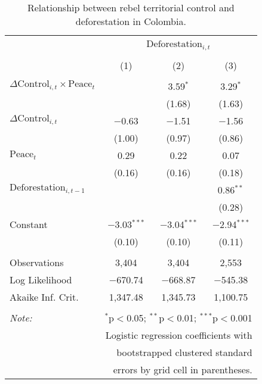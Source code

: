 
\begin{table}[!htbp] \centering 
  \caption{Relationship between rebel territorial control and deforestation in Colombia.} 
  \label{tab:deforest} 
\small 
\begin{tabular}{@{\extracolsep{-6pt}}lccc} 
\\[-1.8ex]\hline 
\hline \\[-1.8ex] 
 & \multicolumn{3}{c}{$\text{Deforestation}_{i,t}$} \\ 
\cline{2-4} 
\\[-1.8ex] & (1) & (2) & (3)\\ 
\hline \\[-1.8ex] 
 $\Delta\text{Control}_{i,t} \times \text{Peace}_{t}$ &  & 3.59$^{*}$ & 3.29$^{*}$ \\ 
  &  & (1.68) & (1.63) \\ 
  $\Delta\text{Control}_{i,t}$ & $-$0.63 & $-$1.51 & $-$1.56 \\ 
  & (1.00) & (0.97) & (0.86) \\ 
  $\text{Peace}_{t}$ & 0.29 & 0.22 & 0.07 \\ 
  & (0.16) & (0.16) & (0.18) \\ 
  $\text{Deforestation}_{i,t-1}$ &  &  & 0.86$^{**}$ \\ 
  &  &  & (0.28) \\ 
  Constant & $-$3.03$^{***}$ & $-$3.04$^{***}$ & $-$2.94$^{***}$ \\ 
  & (0.10) & (0.10) & (0.11) \\ 
 \hline \\[-1.8ex] 
Observations & 3,404 & 3,404 & 2,553 \\ 
Log Likelihood & $-$670.74 & $-$668.87 & $-$545.38 \\ 
Akaike Inf. Crit. & 1,347.48 & 1,345.73 & 1,100.75 \\ 
\hline 
\hline \\[-1.8ex] 
\textit{Note:}  & \multicolumn{3}{r}{$^{*}$p$<$0.05; $^{**}$p$<$0.01; $^{***}$p$<$0.001} \\ 
 & \multicolumn{3}{r}{Logistic regression coefficients with} \\ 
 & \multicolumn{3}{r}{bootstrapped clustered standard} \\ 
 & \multicolumn{3}{r}{errors by grid cell in parentheses.} \\ 
\end{tabular} 
\end{table} 

